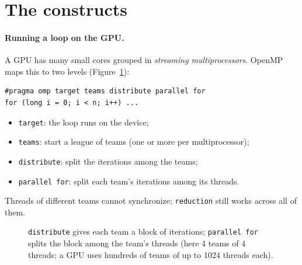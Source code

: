 \documentclass[11pt,a4paper]{article}
\let\origtexttt\texttt
\renewcommand{\texttt}[1]{\textcolor{black!60}{\origtexttt{#1}}}
\begin{document}
\section{The constructs}
\paragraph{Running a loop on the GPU.} A GPU has many small cores grouped in
\emph{streaming multiprocessors}. OpenMP maps this to two levels (Figure~\ref{fig:teams}):
\begin{lstlisting}[numbers=none]
#pragma omp target teams distribute parallel for
for (long i = 0; i < n; i++) ...
\end{lstlisting}
\begin{itemize}
  \item \texttt{target}: the loop runs on the device;
  \item \texttt{teams}: start a league of teams (one or more per multiprocessor);
  \item \texttt{distribute}: split the iterations among the teams;
  \item \texttt{parallel for}: split each team's iterations among its threads.
\end{itemize}
Threads of different teams cannot synchronize; \texttt{reduction} still works across all of
them.

\begin{figure}[H]
\centering
{}
\caption{\texttt{distribute} gives each team a block of iterations; \texttt{parallel for}
splits the block among the team's threads (here 4 teams of 4 threads; a GPU uses hundreds of
teams of up to 1024 threads each).}
\label{fig:teams}
\end{figure}
\end{document}

